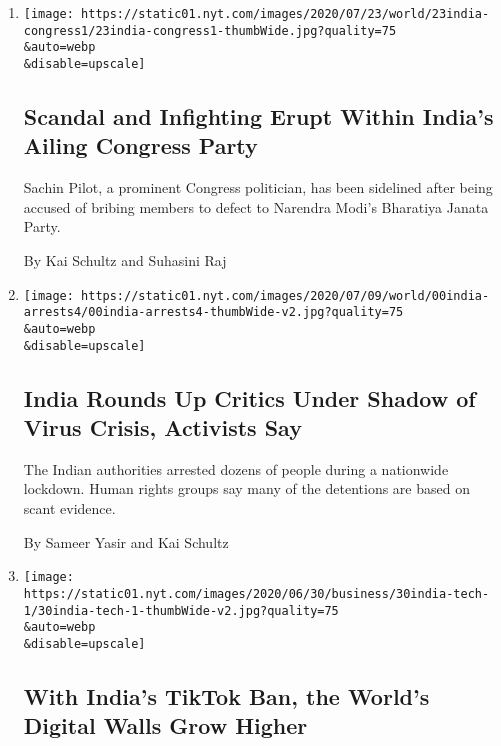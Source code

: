 \begin{enumerate}
\def\labelenumi{\arabic{enumi}.}
\item
  \href{/2020/07/23/world/asia/india-congress-sachin-pilot.html}{}

  \texttt{[image: https://static01.nyt.com/images/2020/07/23/world/23india-congress1/23india-congress1-thumbWide.jpg?quality=75\\\&auto=webp\\\&disable=upscale]}

  \hypertarget{scandal-and-infighting-erupt-within-indias-ailing-congress-party}{%
  \subsection{Scandal and Infighting Erupt Within India's Ailing
  Congress
  Party}\label{scandal-and-infighting-erupt-within-indias-ailing-congress-party}}

  Sachin Pilot, a prominent Congress politician, has been sidelined
  after being accused of bribing members to defect to Narendra Modi's
  Bharatiya Janata Party.

  By Kai Schultz and Suhasini Raj
\item
  \href{/2020/07/19/world/asia/india-activists-arrests-riots-coronavirus.html}{}

  \texttt{[image: https://static01.nyt.com/images/2020/07/09/world/00india-arrests4/00india-arrests4-thumbWide-v2.jpg?quality=75\\\&auto=webp\\\&disable=upscale]}

  \hypertarget{india-rounds-up-critics-under-shadow-of-virus-crisis-activists-say}{%
  \subsection{India Rounds Up Critics Under Shadow of Virus Crisis,
  Activists
  Say}\label{india-rounds-up-critics-under-shadow-of-virus-crisis-activists-say}}

  The Indian authorities arrested dozens of people during a nationwide
  lockdown. Human rights groups say many of the detentions are based on
  scant evidence.

  By Sameer Yasir and Kai Schultz
\item
  \href{/2020/06/30/technology/india-china-tiktok.html}{}

  \texttt{[image: https://static01.nyt.com/images/2020/06/30/business/30india-tech-1/30india-tech-1-thumbWide-v2.jpg?quality=75\\\&auto=webp\\\&disable=upscale]}

  \hypertarget{with-indias-tiktok-ban-the-worlds-digital-walls-grow-higher}{%
  \subsection{With India's TikTok Ban, the World's Digital Walls Grow
  Higher}\label{with-indias-tiktok-ban-the-worlds-digital-walls-grow-higher}}


\end{enumerate}
